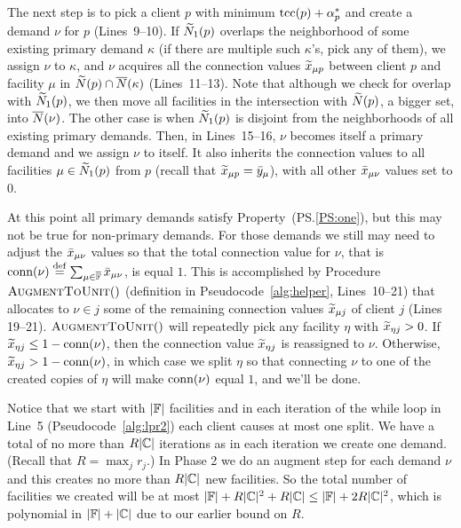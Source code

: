 \documentclass[oneside,final]{ucr}
\begin{document}


The next step is to pick a client $p$ with minimum
$\mbox{\rm{tcc}}(p)+\alpha_p^\ast$ and create a demand $\nu$ for $p$
(Lines~9--10). If ${\widetilde N}_1(p)$ overlaps the neighborhood
of some existing primary demand $\kappa$ (if there are
multiple such $\kappa$'s, pick any of them), we assign $\nu$
to $\kappa$, and $\nu$ acquires all the connection values
${\widetilde x}_{\mu p}$ between client $p$ and facility $\mu$ in
${\widetilde N}(p)\cap {\overline{N}}(\kappa)$ (Lines~11--13). Note that
although we check for overlap with ${\widetilde N}_1(p)$, we then
move all facilities in the intersection with ${\widetilde N}(p)$,
a bigger set, into ${\overline{N}}(\nu)$.  The other case is when
${\widetilde N}_1(p)$ is disjoint from the neighborhoods of all
existing primary demands. Then, in Lines~15--16, $\nu$
becomes itself a primary demand and we assign $\nu$ to
itself. It also inherits the connection values to all
facilities $\mu\in{\widetilde N}_1(p)$ from $p$ (recall that
${\widetilde x}_{\mu p} = {\bar y}_{\mu}$), with all other
${\bar x}_{\mu\nu}$ values set to $0$.

At this point all primary demands satisfy
Property~(PS.\ref{PS:one}), but this may not be true for
non-primary demands. For those demands we still may need to
adjust the ${\bar x}_{\mu\nu}$ values so that the total
connection value for $\nu$, that is ${\textrm{conn}}(\nu) \stackrel{\mathrm{def}}{=}
\sum_{\mu\in\overline{\mathbb{F}}}{\bar x}_{\mu \nu}$, is equal $1$. This
is accomplished by Procedure ${\textsc{AugmentToUnit}}()$ (definition
in Pseudocode~\ref{alg:helper}, Lines~10--21) that allocates
to $\nu\in j$ some of the remaining connection values
${\widetilde x}_{\mu j}$ of client $j$ (Lines 19--21).
${\textsc{AugmentToUnit}}()$ will repeatedly pick any facility $\eta$ with
${\widetilde x}_{\eta j} >0$.  If ${\widetilde x}_{\eta j} \leq
1-{\textrm{conn}}(\nu)$, then the connection value ${\widetilde x}_{\eta
  j}$ is reassigned to $\nu$. 
Otherwise, ${\widetilde x}_{\eta j} >
1-{\textrm{conn}}(\nu)$, in which case we split $\eta$ so that
connecting $\nu$ to one of the created copies of $\eta$ will
make ${\textrm{conn}}(\nu)$ equal $1$, and we'll be done.


\smallskip

Notice that we start with $|\mathbb{F}|$ facilities and in
each iteration of the while loop in Line~5 (Pseudocode~\ref{alg:lpr2}) each client causes at most one split.
 We have a total of no more than $R|\mathbb{C}|$ iterations as in
each iteration we create one demand. (Recall that $R =
\max_jr_j$.) In Phase 2 we do an augment step for each
demand $\nu$ and this creates no more than $R|\mathbb{C}|$
new facilities.  So the total number of facilities we
created will be at most $|\mathbb{F}|+ R|\mathbb{C}|^2 +
R|\mathbb{C}| \leq |\mathbb{F}| + 2R|\mathbb{C}|^2$, which is
polynomial in $|\mathbb{F}|+|\mathbb{C}|$ due to our earlier
bound on $R$.
\end{document}
